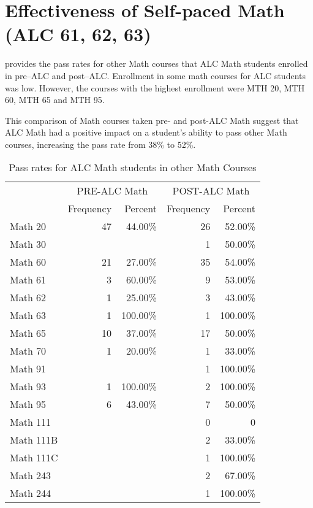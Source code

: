 \chapter{Effectiveness of Self-paced Math (ALC 61, 62, 63)}
\label{app:sec:effectivenessALC}

 provides the pass rates for other Math courses that ALC Math students 
enrolled in pre--ALC and post--ALC.  Enrollment in some math courses for 
ALC students was low.  However, the courses with the highest enrollment 
were MTH 20, MTH 60, MTH 65 and MTH 95.

This comparison of Math courses taken pre- and post-ALC Math suggest 
that ALC Math had a positive impact on a student's ability to pass other 
Math courses, increasing the pass rate from 38\% to 52\%. 

\begin{table}[!htb]
	\centering
	\caption{Pass rates for ALC Math students in other Math Courses}
	\label{app:tab:effectivenessALC}
	\begin{tabular}{lrrrr}
		\toprule
		& \multicolumn{2}{c}{PRE-ALC Math}    & \multicolumn{2}{c}{POST-ALC Math}           \\ 
		          & Frequency & Percent  & Frequency & Percent  \\ 
		\midrule
		Math 20   & 47        & 44.00\%  & 26        & 52.00\%  \\ 
		Math 30   &           &          & 1         & 50.00\%  \\ 
		Math 60   & 21        & 27.00\%  & 35        & 54.00\%  \\ 
		Math 61   & 3         & 60.00\%  & 9         & 53.00\%  \\ 
		Math 62   & 1         & 25.00\%  & 3         & 43.00\%  \\ 
		Math 63   & 1         & 100.00\% & 1         & 100.00\% \\ 
		Math 65   & 10        & 37.00\%  & 17        & 50.00\%  \\ 
		Math 70   & 1         & 20.00\%  & 1         & 33.00\%  \\ 
		Math 91   &           &          & 1         & 100.00\% \\ 
		Math 93   & 1         & 100.00\% & 2         & 100.00\% \\ 
		Math 95   & 6         & 43.00\%  & 7         & 50.00\%  \\ 
		Math 111  &           &          & 0         & 0        \\ 
		Math 111B &           &          & 2         & 33.00\%  \\ 
		Math 111C &           &          & 1         & 100.00\% \\ 
		Math 243  &           &          & 2         & 67.00\%  \\ 
		Math 244  &           &          & 1         & 100.00\% \\ 
		\bottomrule
	\end{tabular}
\end{table}
